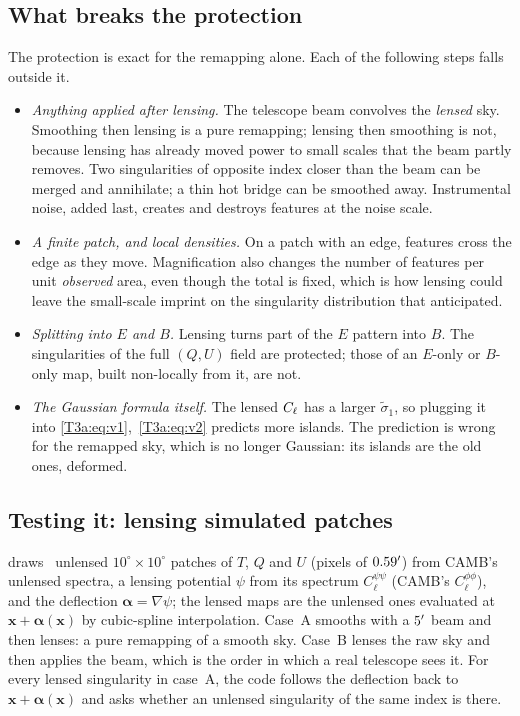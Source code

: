\subsection{What breaks the protection}
\label{T3a:sec:break}

The protection is exact for the remapping alone. Each of the following steps falls outside it.
\begin{itemize}[itemsep=1pt,leftmargin=1.2em]
  \item \emph{Anything applied after lensing.} The telescope beam convolves the \emph{lensed} sky. Smoothing then lensing is a pure remapping; lensing then smoothing is not, because lensing has already moved power to small scales that the beam partly removes. Two singularities of opposite index closer than the beam can be merged and annihilate; a thin hot bridge can be smoothed away. Instrumental noise, added last, creates and destroys features at the noise scale.
  \item \emph{A finite patch, and local densities.} On a patch with an edge, features cross the edge as they move. Magnification also changes the number of features per unit \emph{observed} area, even though the total is fixed, which is how lensing could leave the small-scale imprint on the singularity distribution that \cite{HutererVachaspati2005} anticipated.
  \item \emph{Splitting into $E$ and $B$.} Lensing turns part of the $E$ pattern into $B$. The singularities of the full $(Q,U)$ field are protected; those of an $E$-only or $B$-only map, built non-locally from it, are not.
  \item \emph{The Gaussian formula itself.} The lensed $C_\ell$ has a larger $\tilde\sigma_1$, so plugging it into \eqref{T3a:eq:v1},~\eqref{T3a:eq:v2} predicts more islands. The prediction is wrong for the remapped sky, which is no longer Gaussian: its islands are the old ones, deformed.
\end{itemize}

\subsection{Testing it: lensing simulated patches}
\label{T3a:sec:lens-code}

 draws \TdNreal\ unlensed $10^\circ\times10^\circ$ patches of $T$, $Q$ and $U$ (pixels of $0.59'$) from CAMB's unlensed spectra, a lensing potential $\psi$ from its spectrum $C_\ell^{\psi\psi}$ (CAMB's $C_\ell^{\phi\phi}$), and the deflection $\bm\alpha=\nabla\psi$; the lensed maps are the unlensed ones evaluated at $\bm x+\bm\alpha(\bm x)$ by cubic-spline interpolation. Case~A smooths with a $5'$ beam and then lenses: a pure remapping of a smooth sky. Case~B lenses the raw sky and then applies the beam, which is the order in which a real telescope sees it. For every lensed singularity in case~A, the code follows the deflection back to $\bm x+\bm\alpha(\bm x)$ and asks whether an unlensed singularity of the same index is there.

